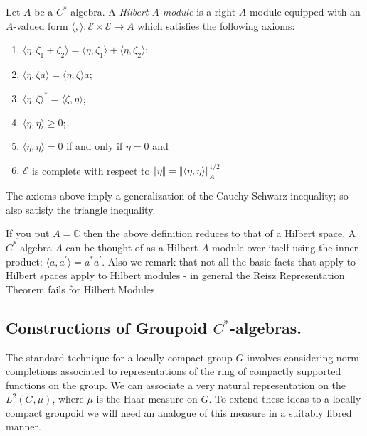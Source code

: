 \begin{definition}
Let $A$ be a $C^{*}$-algebra. A \textit{Hilbert A-module}  is a right $A$-module equipped with an $A$-valued form $\langle , \rangle: \mathscr{E} \times \mathscr{E} \rightarrow A$ which satisfies the following axioms:
\begin{enumerate}
\item $\langle \eta ,\zeta_{1} + \zeta_{2} \rangle = \langle \eta , \zeta_{1}\rangle + \langle \eta ,\zeta_{2} \rangle$;
\item $\langle \eta , \zeta a \rangle = \langle \eta ,\zeta \rangle a$;
\item $\langle \eta , \zeta \rangle^{*} = \langle \zeta ,\eta \rangle$;
\item $\langle \eta, \eta \rangle \geq 0$;
\item $\langle \eta ,\eta  \rangle = 0 $ if and only if $ \eta = 0$ and
\item $\mathscr{E}$ is complete with respect to $\Vert \eta \Vert = \Vert \langle \eta , \eta \rangle \Vert_{A}^{1/2}$
\end{enumerate}
\end{definition}

\begin{remark}
The axioms above imply a generalization of the Cauchy-Schwarz inequality; so also satisfy the triangle inequality.
\end{remark}

\begin{remark}
If you put $A= \mathbb{C}$ then the above definition reduces to that of a Hilbert space. A $C^{*}$-algebra $A$ can be thought of as a Hilbert $A$-module over itself using the inner product: $\langle a, a^{'} \rangle = a^{*}a^{'}$. Also we remark that not all the basic facts that apply to Hilbert spaces apply to Hilbert modules - in general the Reisz Representation Theorem fails for Hilbert Modules.
\end{remark}

\subsection{Constructions of Groupoid \texorpdfstring{$C^{*}$}{C*}-algebras.} The standard technique for a locally compact group $G$ involves considering norm completions associated to representations of the ring of compactly supported functions on the group. We can associate a very natural representation on the $L^{2}(G,\mu)$, where $\mu$ is the Haar measure on $G$. To extend these ideas to a locally compact groupoid we will need an analogue of this measure in a suitably fibred manner.

